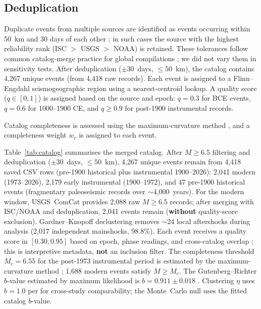 \documentclass[draft]{agujournal2019}
\begin{document}
\subsection{Deduplication}

Duplicate events from multiple sources are identified as events occurring
within 50~km and 30 days of each other \citep[cf.][]{WaldhauserSchaff2008};
in such cases the source with the highest reliability rank (ISC $>$ USGS $>$ NOAA)
is retained.
These tolerances follow common catalog-merge practice for global compilations
\citep{WaldhauserSchaff2008}; we did not vary them in sensitivity tests.
After deduplication ($\pm 30$~days, $\le 50$~km), the catalog contains
4{,}267 unique events (from 4{,}418 raw records).
Each event is assigned to a Flinn--Engdahl seismogeographic region
\citep{Young1996} using a nearest-centroid lookup.
A quality score ($q \in [0,1]$) is assigned based on the source and epoch:
$q = 0.3$ for BCE events, $q = 0.6$ for 1000--1900 CE,
and $q \ge 0.9$ for post-1900 instrumental records.

Catalog completeness is assessed using the maximum-curvature method
\citep{Woessner2005}, and a completeness weight $w_c$ is assigned to
each event.

Table~\ref{tab:catalog} summarises the merged catalog.
After $M \ge 6.5$ filtering and deduplication ($\pm 30$~days, $\le 50$~km),
4{,}267 unique events remain from 4{,}418 saved CSV rows (pre-1900 historical
plus instrumental 1900--2026): 2{,}041 modern (1973--2026), 2{,}179 early instrumental
(1900--1972), and 47 pre-1900 historical events (fragmentary paleoseismic
records over $\sim$4{,}000~years).
For the modern window, USGS~ComCat provides 2{,}088 raw $M \ge 6.5$ records;
after merging with ISC/NOAA and deduplication, 2{,}041 events remain
(\textbf{without} quality-score exclusion).
Gardner--Knopoff declustering removes $\sim$24 local aftershocks during
analysis (2{,}017 independent mainshocks, 98.8\%).
Each event receives a quality score in $[0.30, 0.95]$ based on
epoch, phase readings, and cross-catalog overlap \citep{Woessner2005}; this
is interpretive metadata, \textbf{not} an inclusion filter.
The completeness threshold $M_c = 6.55$ for the post-1973 instrumental
period is estimated by the maximum-curvature method \citep{Woessner2005};
1{,}688 modern events satisfy $M \ge M_c$.
The Gutenberg--Richter $b$-value estimated by maximum likelihood is
$b = 0.911 \pm 0.018$ \citep{Aki1965}.
Clustering $\eta$ uses $b = 1.0$ per \citet{Baiesi2004} for
cross-study comparability; the Monte~Carlo null uses the fitted catalog
$b$-value.
\end{document}
